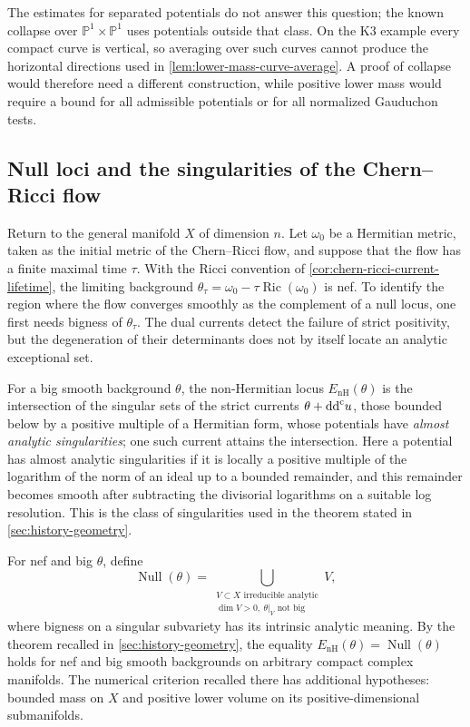 The estimates for separated potentials do not answer this question; the known collapse over $\mathbb P^1\times\mathbb P^1$ uses potentials outside that class. On the K3 example every compact curve is vertical, so averaging over such curves cannot produce the horizontal directions used in \cref{lem:lower-mass-curve-average}. A proof of collapse would therefore need a different construction, while positive lower mass would require a bound for all admissible potentials or for all normalized Gauduchon tests.

\subsection{Null loci and the singularities of the Chern--Ricci flow}

Return to the general manifold $X$ of dimension $n$. Let $\omega_0$ be a Hermitian metric, taken as the initial metric of the Chern--Ricci flow, and suppose that the flow has a finite maximal time $\tau$. With the Ricci convention of \cref{cor:chern-ricci-current-lifetime}, the limiting background $\theta_\tau=\omega_0-\tau\operatorname{Ric}(\omega_0)$ is nef. To identify the region where the flow converges smoothly as the complement of a null locus, one first needs bigness of $\theta_\tau$. The dual currents detect the failure of strict positivity, but the degeneration of their determinants does not by itself locate an analytic exceptional set.

For a big smooth background $\theta$, the non-Hermitian locus $E_{\mathrm{nH}}(\theta)$ is the intersection of the singular sets of the strict currents $\theta+\mathrm{dd}^{\mathrm{c}} u$, those bounded below by a positive multiple of a Hermitian form, whose potentials have \emph{almost analytic singularities}; one such current attains the intersection. Here a potential has almost analytic singularities if it is locally a positive multiple of the logarithm of the norm of an ideal up to a bounded remainder, and this remainder becomes smooth after subtracting the divisorial logarithms on a suitable log resolution. This is the class of singularities used in the theorem stated in \cref{sec:history-geometry}.

For nef and big $\theta$, define
\[
 \operatorname{Null}(\theta)
 =\bigcup_{\substack{V\subset X\text{ irreducible analytic}\\
                     \dim V>0,\ \theta|_V\text{ not big}}}V,
\]
where bigness on a singular subvariety has its intrinsic analytic meaning. By the theorem recalled in \cref{sec:history-geometry}, the equality $E_{\mathrm{nH}}(\theta)=\operatorname{Null}(\theta)$ holds for nef and big smooth backgrounds on arbitrary compact complex manifolds. The numerical criterion recalled there has additional hypotheses: bounded mass on $X$ and positive lower volume on its positive-dimensional submanifolds.

